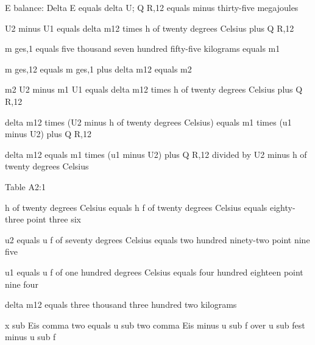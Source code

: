 E balance: Delta E equals delta U; Q R,12 equals minus thirty-five megajoules

U2 minus U1 equals delta m12 times h of twenty degrees Celsius plus Q R,12

m ges,1 equals five thousand seven hundred fifty-five kilograms equals m1

m ges,12 equals m ges,1 plus delta m12 equals m2

m2 U2 minus m1 U1 equals delta m12 times h of twenty degrees Celsius plus Q R,12

delta m12 times (U2 minus h of twenty degrees Celsius) equals m1 times (u1 minus U2) plus Q R,12

delta m12 equals m1 times (u1 minus U2) plus Q R,12 divided by U2 minus h of twenty degrees Celsius

Table A2:1

h of twenty degrees Celsius equals h f of twenty degrees Celsius equals eighty-three point three six

u2 equals u f of seventy degrees Celsius equals two hundred ninety-two point nine five

u1 equals u f of one hundred degrees Celsius equals four hundred eighteen point nine four

delta m12 equals three thousand three hundred two kilograms

x sub Eis comma two equals u sub two comma Eis minus u sub f over u sub fest minus u sub f